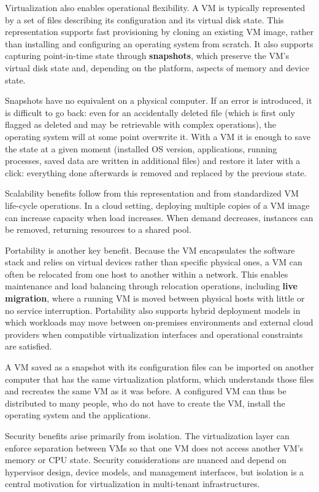 Virtualization also enables operational flexibility. A VM is typically represented by a set of files describing its configuration and its virtual disk state. This representation supports fast provisioning by cloning an existing VM image, rather than installing and configuring an operating system from scratch. It also supports capturing point-in-time state through \textbf{snapshots}, which preserve the VM's virtual disk state and, depending on the platform, aspects of memory and device state.

Snapshots have no equivalent on a physical computer. If an error is introduced, it is difficult to go back: even for an accidentally deleted file (which is first only flagged as deleted and may be retrievable with complex operations), the operating system will at some point overwrite it. With a VM it is enough to save the state at a given moment (installed OS version, applications, running processes, saved data are written in additional files) and restore it later with a click: everything done afterwards is removed and replaced by the previous state.

Scalability benefits follow from this representation and from standardized VM life-cycle operations. In a cloud setting, deploying multiple copies of a VM image can increase capacity when load increases. When demand decreases, instances can be removed, returning resources to a shared pool.

Portability is another key benefit. Because the VM encapsulates the software stack and relies on virtual devices rather than specific physical ones, a VM can often be relocated from one host to another within a network. This enables maintenance and load balancing through relocation operations, including \textbf{live migration}, where a running VM is moved between physical hosts with little or no service interruption. Portability also supports hybrid deployment models in which workloads may move between on-premises environments and external cloud providers when compatible virtualization interfaces and operational constraints are satisfied.

A VM saved as a snapshot with its configuration files can be imported on another computer that has the same virtualization platform, which understands those files and recreates the same VM as it was before. A configured VM can thus be distributed to many people, who do not have to create the VM, install the operating system and the applications.

Security benefits arise primarily from isolation. The virtualization layer can enforce separation between VMs so that one VM does not access another VM's memory or CPU state. Security considerations are nuanced and depend on hypervisor design, device models, and management interfaces, but isolation is a central motivation for virtualization in multi-tenant infrastructures.

